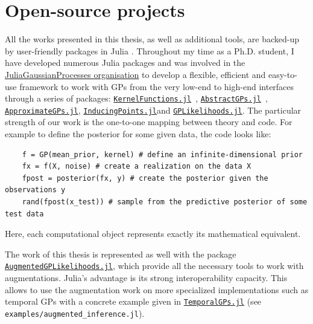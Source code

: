 \section{Open-source projects}

All the works presented in this thesis, as well as additional tools, are backed-up by user-friendly packages in Julia \cite{Julia-2017}.
Throughout my time as a Ph.D. student, I have developed numerous Julia packages and was involved in the \href{https://github.com/JuliaGaussianProcesses}{JuliaGaussianProcesses organisation} to develop a flexible, efficient and easy-to-use framework to work with \acp{GP} from the very low-end to high-end interfaces through a series of packages: \href{https://github.com/JuliaGaussianProcesses/KernelFunctions.jl}{\texttt{KernelFunctions.jl}}~\cite{theo_galy_fajou_2022_6246597}, \href{https://github.com/JuliaGaussianProcesses/AbstractGPs.jl}{\texttt{AbstractGPs.jl}}~\cite{david_widmann_2022_5939997}, \href{https://github.com/JuliaGaussianProcesses/ApproximateGPs.jl}{\texttt{ApproximateGPs.jl}}, \href{https://github.com/JuliaGaussianProcesses/InducingPoints.jl}{\texttt{InducingPoints.jl}}and \href{https://github.com/JuliaGaussianProcesses/GPLikelihoods.jl}{\texttt{GPLikelihoods.jl}}.
The particular strength of our work is the one-to-one mapping between theory and code.
For example to define the posterior for some given data, the code looks like:
\begin{verbatim}
    f = GP(mean_prior, kernel) # define an infinite-dimensional prior
    fx = f(X, noise) # create a realization on the data X
    fpost = posterior(fx, y) # create the posterior given the observations y
    rand(fpost(x_test)) # sample from the predictive posterior of some test data
\end{verbatim}
Here, each computational object represents exactly its mathematical equivalent.

The work of this thesis is represented as well with the package \href{https://github.com/JuliaGaussianProcesses/AugmentedGPLikelihoods.jl}{\texttt{AugmentedGPLikelihoods.jl}}, which provide all the necessary tools to work with augmentations.
Julia's advantage is its strong interoperability capacity.
This allows to use the augmentation work on more specialized implementations such as temporal \acp{GP} with a concrete example given in \href{https://github.com/JuliaGaussianProcesses/TemporalGPs.jl}{\texttt{TemporalGPs.jl}} (see \texttt{examples/augmented\_inference.jl}).

